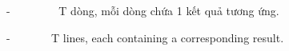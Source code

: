 -         T dòng, mỗi dòng chứa 1 kết quả tương ứng.

-         T lines, each containing a corresponding result.